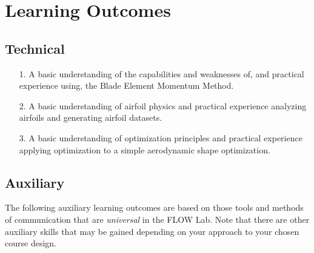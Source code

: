 \documentclass[12pt]{article}
\begin{document}
\section{Learning Outcomes}
\label{sec:learningoutcomes}


\subsection{Technical}
\label{ssec:technicaloutcomes}

\begin{enumerate}
	\item[1.] A basic understanding of the capabilities and weaknesses of, and practical experience using, the Blade Element Momentum Method.
	\item[2.] A basic understanding of airfoil physics and practical experience analyzing airfoils and generating airfoil datasets.
	\item[3.] A basic understanding of optimization principles and practical experience applying optimization to a simple aerodynamic shape optimization.
\end{enumerate}


\subsection{Auxiliary}
\label{ssec:auxiliaryoutcomes}

The following auxiliary learning outcomes are based on those tools and methods of communication that are \textit{universal} in the FLOW Lab.  Note that there are other auxiliary skills that may be gained depending on your approach to your chosen course design.
\end{document}
